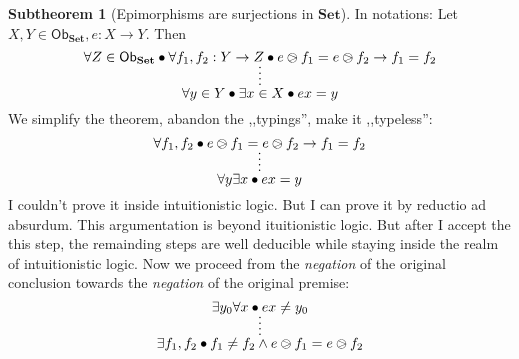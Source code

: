 \documentclass{article}
\newcommand{\obSet}{\ob_{\setCat}}
\newcommand{\ob}{\mathsf{Ob}}
\newcommand{\setCat}{\mathbf{Set}}
\theoremstyle{definition}
\newtheorem{sth}{Subtheorem}[thm]
\begin{document}
	\begin{sth}[Epimorphisms are surjections in $\setCat$]

		In notations: Let $X, Y \in \obSet, e: X \to Y$. Then
		\[
			\infer*{
				\forall y \in Y \bullet \exists x \in X \bullet ex = y
			}
			{
				\forall Z \in \obSet \bullet \forall f_1, f_2: Y \to Z \bullet e\ogreaterthan f_1 = e\ogreaterthan f_2 \to f_1 = f_2
			}
		\]
		We simplify the theorem, abandon the ,,typings'', make it ,,typeless'':
		\[
			\infer*{
				\forall y \exists x \bullet ex = y
			}
			{
				\forall f_1, f_2 \bullet e\ogreaterthan f_1 = e\ogreaterthan f_2 \to f_1 = f_2
			}
		\]
		I couldn't prove it inside intuitionistic logic. But I can prove it by reductio ad absurdum. This argumentation is beyond ituitionistic logic.
		But after I accept the this step, the remainding steps are well deducible while staying inside the realm of intuitionistic logic.
		Now we proceed from the \emph{negation} of the original conclusion towards the \emph{negation} of the original premise:
		\[
			\infer*{
				\exists f_1, f_2 \bullet f_1 \neq f_2 \land e\ogreaterthan f_1 = e\ogreaterthan f_2
			}
			{
				\exists y_0 \forall x \bullet ex \neq y_0
			}
		\]
	\end{sth}
\end{document}
